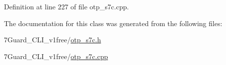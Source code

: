 Definition at line 227 of file otp\+\_\+s7c.\+cpp.



The documentation for this class was generated from the following files\+:\begin{DoxyCompactItemize}
\item 
7\+Guard\+\_\+\+C\+L\+I\+\_\+v1free/\mbox{\hyperlink{otp__s7c_8h}{otp\+\_\+s7c.\+h}}\item 
7\+Guard\+\_\+\+C\+L\+I\+\_\+v1free/\mbox{\hyperlink{otp__s7c_8cpp}{otp\+\_\+s7c.\+cpp}}\end{DoxyCompactItemize}
